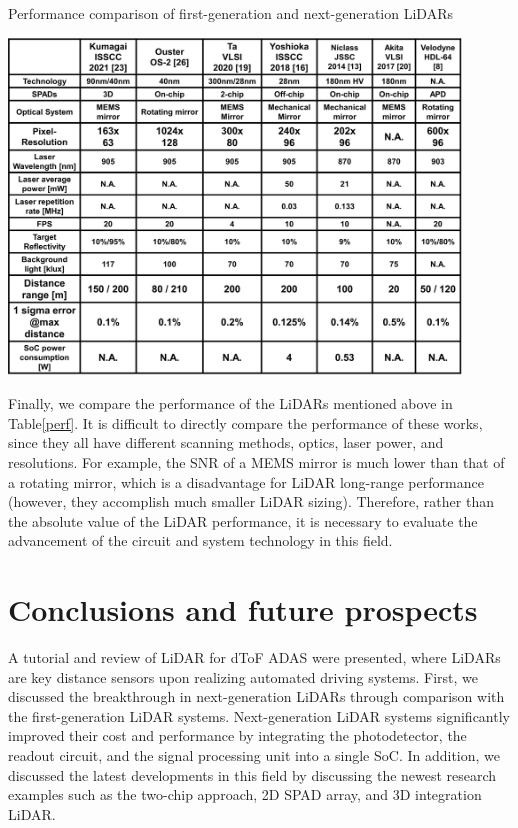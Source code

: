 \documentclass[paper]{ieice}
\begin{document}
\begin{table}[!t]
\centering
\caption{Performance comparison of first-generation and next-generation LiDARs}
 \includegraphics[width=0.9\textwidth]{figs/performance.png}
\label{perf}
\end{table}

Finally, we compare the performance of the LiDARs mentioned above in Table\ref{perf}. It is difficult to directly compare the performance of these works, since they all have different scanning methods, optics, laser power, and resolutions. For example, the SNR of a MEMS mirror is much lower than that of a rotating mirror, which is a disadvantage for LiDAR long-range performance (however, they accomplish much smaller LiDAR sizing). Therefore, rather than the absolute value of the LiDAR performance, it is necessary to evaluate the advancement of the circuit and system technology in this field.

\section{Conclusions and future prospects}
\qquad A tutorial and review of LiDAR for dToF ADAS were presented, where LiDARs are key distance sensors upon realizing automated driving systems. First, we discussed the breakthrough in next-generation LiDARs through comparison with the first-generation LiDAR systems. Next-generation LiDAR systems significantly improved their cost and performance by integrating the photodetector, the readout circuit, and the signal processing unit into a single SoC.
In addition, we discussed the latest developments in this field by discussing the newest research examples such as the two-chip approach, 2D SPAD array, and 3D integration LiDAR.
\end{document}
